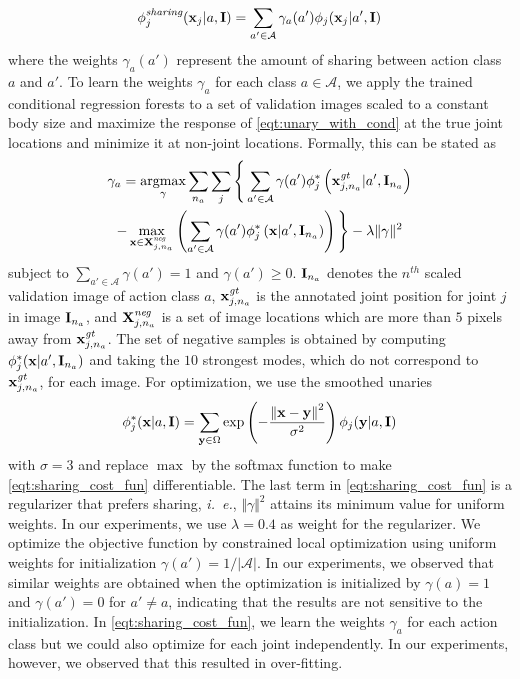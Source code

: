 \documentclass[a4paper, 10pt, conference]{ieeeconf}      \usepackage{FG2017}
\newcommand{\ie}{\mbox{\emph{i. e.}}}
\DeclareMathOperator*{\argmax}{argmax}
\begin{document}
\begin{equation}
\label{eqt:unary_with_cond}
\phi^{\textit{sharing}}_j(\bold{x}_j|a, \bold{I}) = \sum_{a'  \in \mathcal{A}} \gamma_{a}(a') \phi_j(\bold{x}_j|a',\bold{I})
\end{equation} 
where the weights $\gamma_{a}(a')$ represent the amount of sharing between action class $a$ and $a'$. To learn the weights $\gamma_{a}$ for each class $a \in \mathcal{A}$, we apply the trained conditional regression forests to a set of validation images scaled to a constant body size and maximize the response of \eqref{eqt:unary_with_cond} at the true joint locations and minimize it at non-joint locations. Formally, this can be stated as
\begin{multline}
\label{eqt:sharing_cost_fun}
\gamma_a = \argmax_{\gamma} \sum_{n_a} \sum_{j} \Bigg\{ \sum_{a' \in \mathcal{A}} \gamma(a') \phi^*_{j}\left(\bold{x}^{\textit{gt}}_{j,n_a}\vert{a'},\bold{I}_{n_a}\right)  \\ - \max_{\bold{x} \in \bold{X}_{j,n_a}^{\textit{neg}}}\left(\sum_{a' \in \mathcal{A}} \gamma(a') \phi^*_{j}\left(\bold{x}\vert{a'},\bold{I}_{n_a}\right)\right) \Bigg\} - \lambda \Vert \gamma \Vert^2
\end{multline}
subject to $\sum_{a'  \in \mathcal{A}} \gamma(a') = 1$ and $\gamma(a') \geq 0$. $\bold{I}_{n_a}$ denotes the $n^{th}$ scaled validation image of action class $a$, $\bold{x}^{\textit{gt}}_{j,n_a}$ is the annotated joint position for joint $j$ in image $\bold{I}_{n_a}$, and $\bold{X}_{j,n_a}^{\textit{neg}}$ is a set of image locations which are more than $5$ pixels away from $\bold{x}^{\textit{gt}}_{j,n_a}$. 
The set of negative samples is obtained by computing $\phi^*_{j}(\bold{x}\vert{a'},\bold{I}_{n_a})$ and taking the $10$ strongest modes, which do not correspond to $\bold{x}^{\textit{gt}}_{j,n_a}$, for each image. For optimization, we use the smoothed unaries
\begin{equation}
\phi_{j}^{*}(\bold{x}|a,\bold{I}) = \sum_{\bold{y} \in \Omega} \exp\left(-\dfrac{{\Vert \bold{x}-\bold{y}\Vert}^2}{\sigma^2}\right) \phi_{j}(\bold{y}|a,\bold{I}) 
\end{equation}
with $\sigma = 3$ and replace $\max$ by the softmax function to make \eqref{eqt:sharing_cost_fun} differentiable. The last term in \eqref{eqt:sharing_cost_fun} is a regularizer that prefers sharing, \ie, $\Vert \gamma \Vert^2$ attains its minimum value for uniform weights. In our experiments, we use $\lambda=0.4$ as weight for the regularizer.    
We optimize the objective function by constrained local optimization using uniform weights for initialization $\gamma(a')=1/\vert\mathcal{A} \vert$. In our experiments, we observed that similar weights are obtained when the optimization is initialized by $\gamma(a)=1$ and $\gamma(a')=0$ for $a'\neq a$, indicating that the results are not sensitive to the initialization.   
In \eqref{eqt:sharing_cost_fun}, we learn the weights $\gamma_a$ for each action class but we could also optimize for each joint independently. In our experiments, however, we observed that this resulted in over-fitting. 
\end{document}
